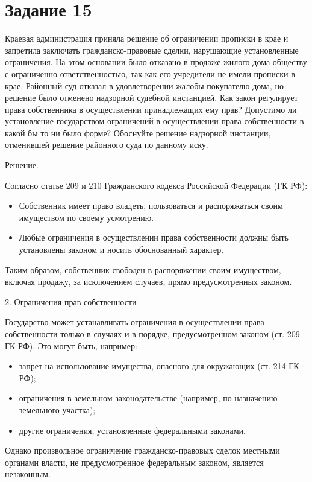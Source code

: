 \documentclass[14pt,a4paper]{extarticle}
\begin{document}
\section{Задание 15}
Краевая администрация приняла решение об ограничении прописки в крае и
запретила заключать гражданско-правовые сделки, нарушающие установленные
ограничения. На этом основании было отказано в продаже жилого дома обществу с
ограниченно ответственностью, так как его учредители не имели прописки в крае.
Районный суд отказал в удовлетворении жалобы покупателю дома, но решение было
отменено надзорной судебной инстанцией. Как закон регулирует права собственника в
осуществлении принадлежащих ему прав? Допустимо ли установление государством
ограничений в осуществлении права собственности в какой бы то ни было форме?
Обоснуйте решение надзорной инстанции, отменившей решение районного суда по
данному иску.

Решение.

Согласно статье 209 и 210 Гражданского кодекса Российской Федерации (ГК РФ):

\begin{itemize}
    \item Собственник имеет право владеть, пользоваться и распоряжаться своим имуществом по своему усмотрению.
    \item Любые ограничения в осуществлении права собственности должны быть установлены законом и носить обоснованный характер.
\end{itemize}

Таким образом, собственник свободен в распоряжении своим имуществом, включая продажу, за исключением случаев, прямо предусмотренных законом.

2. Ограничения прав собственности

Государство может устанавливать ограничения в осуществлении права собственности только в случаях и в порядке, предусмотренном законом (ст. 209 ГК РФ). Это могут быть, например:

\begin{itemize}
    \item запрет на использование имущества, опасного для окружающих (ст. 214 ГК РФ);
    \item ограничения в земельном законодательстве (например, по назначению земельного участка);
    \item другие ограничения, установленные федеральными законами.
\end{itemize}

Однако произвольное ограничение гражданско-правовых сделок местными органами власти, не предусмотренное федеральным законом, является незаконным.
\end{document}
